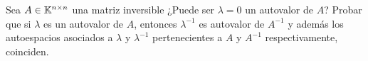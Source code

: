 \item Sea $A\in\mathbb{K}^{n\times n}$ una matriz inversible ¿Puede ser $\lambda=0$ un autovalor de $A$? Probar que si $\lambda$ es un autovalor de $A$, entonces $\lambda^{-1}$ es autovalor de $A^{-1}$ y además los autoespacios asociados a $\lambda$ y $\lambda^{-1}$ pertenecientes a $A$ y $A^{-1}$ respectivamente, coinciden.
    \begin{mdframed}[style=s]
        
    \end{mdframed}